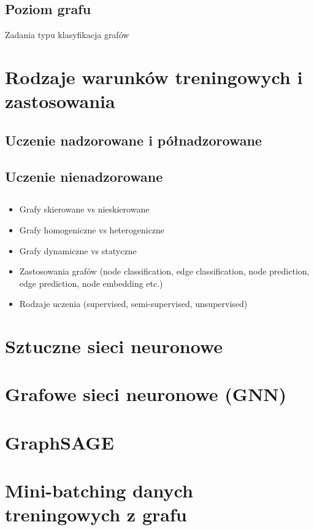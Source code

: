 \documentclass[12pt,a4paper,twoside,openany]{book}
\begin{document}
\subsection{Poziom grafu}
Zadania typu klasyfikacja grafów

\section{Rodzaje warunków treningowych i zastosowania}
\subsection{Uczenie nadzorowane i półnadzorowane}
\subsection{Uczenie nienadzorowane}
\subsection{}

\begin{itemize}

  \item Grafy skierowane vs nieskierowane
  \item Grafy homogeniczne vs heterogeniczne
  \item Grafy dynamiczne vs statyczne
  \item Zastosowania grafów (node classification, edge classification, node
        prediction, edge prediction, node embedding etc.)
  \item Rodzaje uczenia (supervised, semi-supervised, unsupervised)

\end{itemize}

\section{Sztuczne sieci neuronowe}
\section{Grafowe sieci neuronowe (GNN)}
\section{GraphSAGE}


\section{Mini-batching danych treningowych z grafu}
\end{document}
